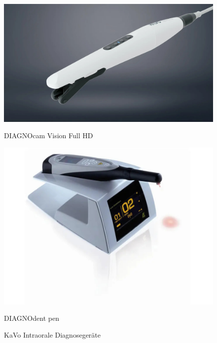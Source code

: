 \vspace{-1em}
\begin{figure}[H]
  \centering
  \begin{minipage}[b]{0.40\textwidth}
    \centering
    \includegraphics[width=\textwidth]{images/DIAGNOcam-Vision-Full-HD_Header-dark-V4_16-7-3840px.jpg}
    \caption*{DIAGNOcam Vision Full HD}
  \end{minipage}
  \hspace{0.05\textwidth}
  \begin{minipage}[b]{0.40\textwidth}
    \centering
    \includegraphics[width=\textwidth]{images/DIAGNOdent-pen_1809px.jpg}
    \caption*{DIAGNOdent pen}
  \end{minipage}
  \caption{KaVo Intraorale Diagnosegeräte}
  \label{fig:Intraorale Diagnosegeräte}
\end{figure}
\vspace{1em}

